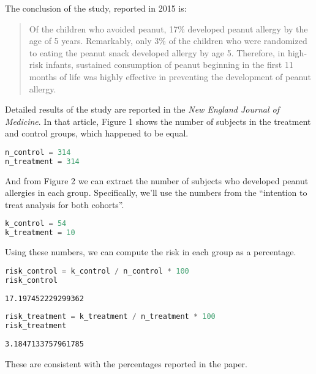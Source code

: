 The conclusion of the study, reported in 2015 is:

\begin{quote}
Of the children who avoided peanut, 17\% developed peanut allergy by the
age of 5 years. Remarkably, only 3\% of the children who were randomized
to eating the peanut snack developed allergy by age 5. Therefore, in
high-risk infants, sustained consumption of peanut beginning in the
first 11 months of life was highly effective in preventing the
development of peanut allergy.
\end{quote}

Detailed results of the study are reported in the \emph{New England
Journal of Medicine}. In that article, Figure 1 shows the number of
subjects in the treatment and control groups, which happened to be
equal.

\begin{lstlisting}[language=Python,style=source]
n_control = 314
n_treatment = 314
\end{lstlisting}

And from Figure 2 we can extract the number of subjects who developed
peanut allergies in each group. Specifically, we'll use the numbers from
the ``intention to treat analysis for both cohorts''.

\begin{lstlisting}[language=Python,style=source]
k_control = 54
k_treatment = 10
\end{lstlisting}

Using these numbers, we can compute the risk in each group as a
percentage.

\begin{lstlisting}[language=Python,style=source]
risk_control = k_control / n_control * 100
risk_control
\end{lstlisting}

\begin{lstlisting}[style=output]
17.197452229299362
\end{lstlisting}

\begin{lstlisting}[language=Python,style=source]
risk_treatment = k_treatment / n_treatment * 100
risk_treatment
\end{lstlisting}

\begin{lstlisting}[style=output]
3.1847133757961785
\end{lstlisting}

These are consistent with the percentages reported in the paper.


